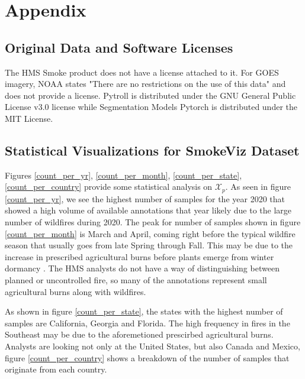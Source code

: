 \documentclass{article}
\begin{document}


\appendix

\section{Appendix}



\subsection{Original Data and Software Licenses}
The HMS Smoke product does not have a license attached to it. For GOES imagery, NOAA states "There are no restrictions on the use of this data" and does not provide a license. Pytroll is distributed under the GNU General Public License v3.0 license while Segmentation Models Pytorch is distributed under the MIT License.


\subsection{Statistical Visualizations for SmokeViz Dataset}

Figures \ref{count_per_yr}, \ref{count_per_month}, \ref{count_per_state}, \ref{count_per_country} provide some statistical analysis on \(\mathcal{X}_p\). As seen in figure \ref{count_per_yr}, we see the highest number of samples for the year 2020 that showed a high volume of available annotations that year likely due to the large number of wildfires \cite{fires2020} during 2020. The peak for number of samples shown in figure \ref{count_per_month} is March and April, coming right before the typical wildfire season that usually goes from late Spring through Fall. This may be due to the increase in prescribed agricultural burns before plants emerge from winter dormancy \cite{ag_fire}. The HMS analysts do not have a way of distinguishing between planned or uncontrolled fire, so many of the annotations represent small agricultural burns along with wildfires. 

As shown in figure \ref{count_per_state}, the states with the highest number of samples are California, Georgia and Florida. The high frequency in fires in the Southeast may be due to the aforemetioned prescirbed agricultural burns. Analysts are looking not only at the United States, but also Canada and Mexico, figure \ref{count_per_country} shows a breakdown of the number of samples that originate from each country.
\end{document}
